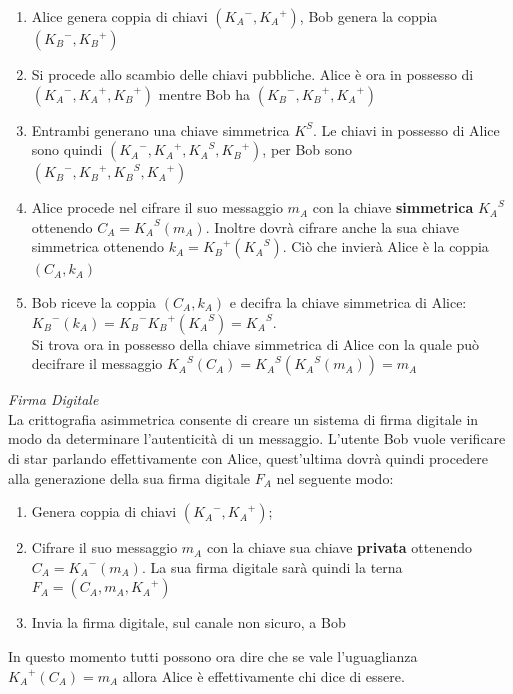 \documentclass[a4paper,12pt]{tesiinfo}
\begin{document}
\begin{enumerate}
    \item Alice genera coppia di chiavi $({K_A}^-, {K_A}^+)$, Bob genera la coppia $({K_B}^-, {K_B}^+)$
    \item Si procede allo scambio delle chiavi pubbliche. Alice \`e ora in possesso di $({K_A}^-, {K_A}^+, {K_B}^+)$ mentre Bob ha $({K_B}^-, {K_B}^+, {K_A}^+)$
    \item Entrambi generano una chiave simmetrica $K^S$. Le chiavi in possesso di Alice sono quindi $({K_A}^-, {K_A}^+, {K_A}^S, {K_B}^+)$, per Bob sono $({K_B}^-, {K_B}^+, {K_B}^S, {K_A}^+)$
    \item Alice procede nel cifrare il suo messaggio $m_A$ con la chiave \textbf{simmetrica} ${K_A}^S$ ottenendo $C_A = {K_A}^S(m_A)$. Inoltre dovr\`a cifrare anche la sua chiave simmetrica ottenendo $k_A={K_B}^+({K_A}^S)$. Ci\`o che invier\`a Alice \`e la coppia $(C_A, k_A)$
    \item Bob riceve la coppia $(C_A, k_A)$ e decifra la chiave simmetrica di Alice:\\ ${K_B}^-(k_A)={K_B}^-{K_B}^+({K_A}^S)={K_A}^S$. \\Si trova ora in possesso della chiave simmetrica di Alice con la quale pu\`o decifrare il messaggio ${K_A}^S(C_A)={K_A}^S({K_A}^S(m_A))=m_A$
\end{enumerate}
%
%
%
\textit{Firma Digitale} 
\\
La crittografia asimmetrica consente di creare un sistema di firma digitale in modo da determinare l'autenticit\`a di un messaggio. L'utente Bob vuole verificare di star parlando effettivamente con Alice, quest'ultima dovr\`a quindi procedere alla generazione della sua firma digitale $F_A$ nel seguente modo: 
\begin{enumerate}
    \item Genera coppia di chiavi $({K_A}^-, {K_A}^+)$;
    \item Cifrare il suo messaggio $m_A$ con la chiave sua chiave \textbf{privata} ottenendo $C_A = {K_A}^-(m_A)$. La sua firma digitale sar\`a quindi la terna $F_A = (C_A, m_A, {K_A}^+)$
    \item Invia la firma digitale, sul canale non sicuro, a Bob
\end{enumerate}
In questo momento tutti possono ora dire che se vale l'uguaglianza ${K_A}^+(C_A) = m_A$ allora Alice \`e effettivamente chi dice di essere.
\\
\end{document}
